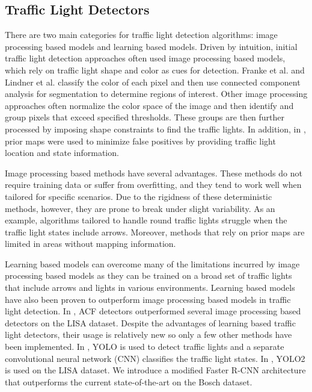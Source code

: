 \documentclass[10pt, conference, compsocconf]{IEEEtran}
\begin{document}
\subsection{Traffic Light Detectors}
There are two main categories for traffic light detection algorithms: image processing based models and learning based models. Driven by intuition, initial traffic light detection approaches often used image processing based models, which rely on traffic light shape and color as cues for detection. Franke et al. \cite{franke1999} and Lindner et al. \cite{lindner} classify the color of each pixel and then use connected component analysis for segmentation to determine regions of interest. Other image processing approaches \cite{masakoomachi2009,yehushen2009} often normalize the color space of the image and then identify and group pixels that exceed specified thresholds. These groups are then further processed by imposing shape constraints to find the traffic lights. In addition, in \cite{lindner,fairfield2011}, prior maps were used to minimize false positives by providing traffic light location and state information. 

Image processing based methods have several advantages. These methods do not require training data or suffer from overfitting, and they tend to work well when tailored for specific scenarios. Due to the rigidness of these deterministic methods, however, they are prone to break under slight variability. As an example, algorithms tailored to handle round traffic lights struggle when the traffic light states include arrows. Moreover, methods that rely on prior maps are limited in areas without mapping information.

Learning based models can overcome many of the limitations incurred by image processing based models as they can be trained on a broad set of traffic lights that include arrows and lights in various environments. Learning based models have also been proven to outperform image processing based models in traffic light detection. In \cite{jensen2015, lisa1}, ACF detectors outperformed several image processing based detectors on the LISA dataset. Despite the advantages of learning based traffic light detectors, their usage is relatively new so only a few other methods have been implemented. In \cite{behrendt2017}, YOLO \cite{redmon2015} is used to detect traffic lights and a separate convolutional neural network (CNN) classifies the traffic light states. In \cite{jensen}, YOLO2 \cite{redmon2016} is used on the LISA dataset. We introduce a modified Faster R-CNN \cite{ren2015} architecture that outperforms the current state-of-the-art on the Bosch dataset.
\end{document}
